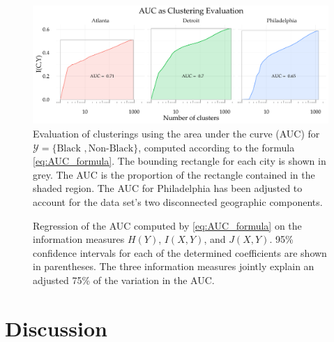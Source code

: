\documentclass[9pt,twocolumn,twoside]{pnas-new}
\begin{document}
	\begin{figure}
			\includegraphics[width=\linewidth]{figs/AUC_illustration.pdf}
			\caption{
				Evaluation of clusterings using the area under the curve (AUC) for $\mathcal{Y} = \{\text{Black }, \text{Non-Black}\}$, computed according to the formula \eqref{eq:AUC_formula}. 
				The bounding rectangle for each city is shown in grey. 
				The AUC is the proportion of the rectangle contained in the shaded region. 
				The AUC for Philadelphia has been adjusted to account for the data set's two disconnected geographic components.
			} \label{fig:AUC}
	\end{figure}
	\begin{figure}
		\centering
		
		\caption{
			Regression of the AUC computed by \eqref{eq:AUC_formula} on the information measures $H(Y)$, $I(X,Y)$, and $J(X,Y)$. 
			95\% confidence intervals for each of the determined coefficients are shown in parentheses. 
			The three information measures jointly explain an adjusted 75\% of the variation in the AUC. 
		}\label{fig:regression}
	\end{figure}

\section*{Discussion}



\showmatmethods{} %


\showacknow{} %


\nocite{Bettencourt2013}


\end{document}
